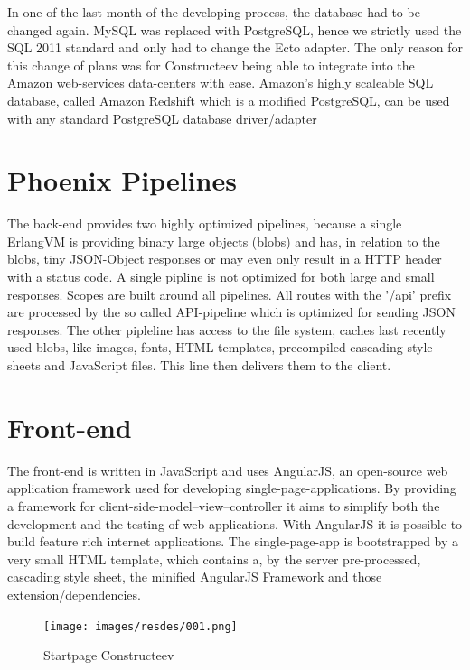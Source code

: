 \textcolor{newcode}{In one of the last month of the developing process, the database had to be changed again. MySQL was replaced with PostgreSQL, hence we strictly used the SQL 2011 standard and only had to change the Ecto adapter. The only reason for this change of plans was for Constructeev being able to integrate into the Amazon web-services data-centers with ease. Amazon's highly scaleable SQL database, called Amazon Redshift which is a modified PostgreSQL, can be used with any standard PostgreSQL database driver/adapter}	

\section{Phoenix Pipelines}
The back-end provides two highly optimized pipelines, because a single ErlangVM is providing binary large objects (blobs) and has, in relation to the blobs, tiny JSON-Object responses or may even only result in a HTTP header with a status code. A single pipline is not optimized for both large and small responses. Scopes are built around all pipelines. All routes with the '/api' prefix are processed by the so called API-pipeline which is optimized for sending JSON responses. The other pipleline has access to the file system, caches last recently used blobs, like images, fonts, HTML templates, precompiled cascading style sheets and JavaScript files. This line then delivers them to the client. 

\section{Front-end}
The front-end is written in JavaScript and uses AngularJS, an open-source web application framework used for developing single-page-applications. By providing a framework for client-side-model–view–controller it aims to simplify both the development and the testing of web applications. With AngularJS it is possible to build feature rich internet applications. The single-page-app is bootstrapped by a very small HTML template, which contains a, by the server pre-processed, cascading style sheet, the minified AngularJS Framework and those extension/dependencies. 

\begin{figure}[H]
  \caption{Startpage Constructeev}
  \centering
    \texttt{[image: images/resdes/001.png]}
\end{figure}

